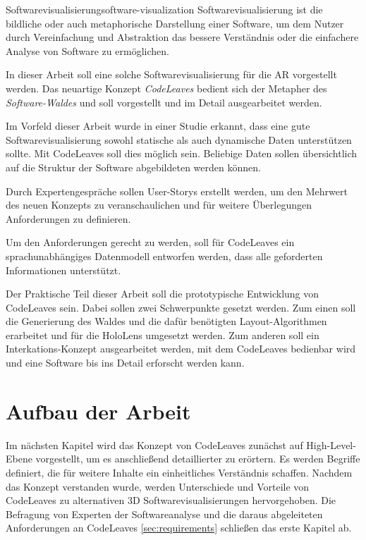 \begin{defbox}{Softwarevisualisierung}{software-visualization}
Softwarevisualisierung ist die bildliche oder auch metaphorische Darstellung einer Software, um dem Nutzer durch Vereinfachung und Abstraktion das bessere Verständnis oder die einfachere Analyse von Software zu ermöglichen.
\end{defbox}

In dieser Arbeit soll eine solche Softwarevisualisierung für die AR vorgestellt werden. Das neuartige Konzept \emph{CodeLeaves} bedient sich der Metapher des \textit{Software-Waldes} und soll vorgestellt und im Detail ausgearbeitet werden.

Im Vorfeld dieser Arbeit wurde in einer Studie erkannt, dass eine gute Softwarevisualisierung sowohl statische als auch dynamische Daten unterstützen sollte. Mit CodeLeaves soll dies möglich sein. Beliebige Daten sollen übersichtlich auf die Struktur der Software abgebildeten werden können.

Durch Expertengespräche sollen User-Storys erstellt werden, um den Mehrwert des neuen Konzepts zu veranschaulichen und für weitere Überlegungen Anforderungen zu definieren.

Um den Anforderungen gerecht zu werden, soll für CodeLeaves ein sprachunabhängiges Datenmodell entworfen werden, dass alle geforderten Informationen unterstützt.

Der Praktische Teil dieser Arbeit soll die prototypische Entwicklung von CodeLeaves sein. Dabei sollen zwei Schwerpunkte gesetzt werden. Zum einen soll die Generierung des Waldes und die dafür benötigten Layout-Algorithmen erarbeitet und für die HoloLens umgesetzt werden. Zum anderen soll ein Interkations-Konzept ausgearbeitet werden, mit dem CodeLeaves bedienbar wird und eine Software bis ins Detail erforscht werden kann.

\section{Aufbau der Arbeit}
Im nächsten Kapitel wird das Konzept von CodeLeaves zunächst auf High-Level-Ebene vorgestellt, um es anschließend detaillierter zu erörtern. Es werden Begriffe definiert, die für weitere Inhalte ein einheitliches Verständnis schaffen. Nachdem das Konzept verstanden wurde, werden Unterschiede und Vorteile von CodeLeaves zu alternativen 3D Softwarevisualisierungen hervorgehoben. Die Befragung von Experten der Softwareanalyse und die daraus abgeleiteten Anforderungen an CodeLeaves \ref{sec:requirements} schließen das erste Kapitel ab.

